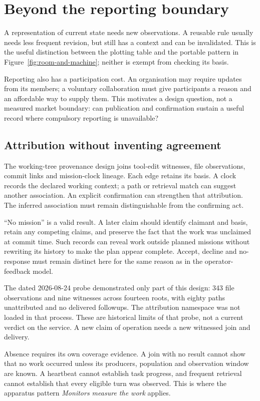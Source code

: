 \section{Beyond the reporting boundary}\label{sec:boundary}

A representation of current state needs new observations. A reusable rule
usually needs less frequent revision, but still has a context and can be
invalidated. This is the useful distinction between the plotting table and the
portable pattern in Figure~\ref{fig:room-and-machine}; neither is exempt from
checking its basis.

Reporting also has a participation cost. An organisation may require updates
from its members; a voluntary collaboration must give participants a reason
and an affordable way to supply them. This motivates a design question, not a
measured market boundary: can publication and confirmation sustain a useful
record where compulsory reporting is unavailable?

\subsection*{Attribution without inventing agreement}

The working-tree provenance design joins tool-edit witnesses, file observations,
commit links and mission-clock lineage. Each edge retains its basis.
A clock records the declared working context; a path or retrieval match can
suggest another association. An explicit confirmation can strengthen that
attribution. The inferred association must remain distinguishable from the
confirming act.

``No mission'' is a valid result. A later claim should identify claimant and
basis, retain any competing claims, and preserve the fact that the work was
unclaimed at commit time. Such records can reveal work outside planned
missions without rewriting its history to make the plan appear complete.
Accept, decline and no-response must remain distinct here for the same reason
as in the operator-feedback model.

The dated 2026-08-24 probe demonstrated only part of this design: 343 file
observations and nine witnesses across fourteen roots, with eighty paths
unattributed and no delivered followups. The attribution namespace was not
loaded in that process. These are historical limits of that probe, not a
current verdict on the service. A new claim of operation needs a new witnessed
join and delivery.

Absence requires its own coverage evidence. A join with no result cannot show
that no work occurred unless its producers, population and observation window
are known. A heartbeat cannot establish task progress, and frequent retrieval
cannot establish that every eligible turn was observed. This is where the
apparatus pattern \emph{Monitors measure the work} applies.

